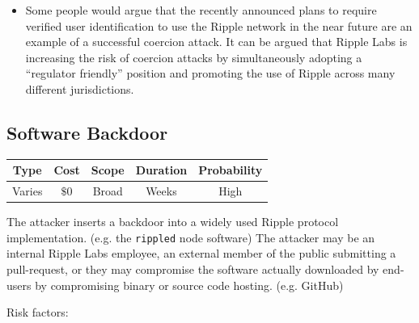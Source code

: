 \documentclass{article}
\begin{document}
\begin{itemize}
    \item Some people would argue that the recently announced
        plans\cite{cointelegraph-ripple-aml} to require verified user
        identification to use the Ripple network in the near future are an
        example of a successful coercion attack. It can be argued that Ripple
        Labs is increasing the risk of coercion attacks by simultaneously
        adopting a ``regulator friendly'' position and promoting the use of
        Ripple across many different jurisdictions.

\end{itemize}

\subsection{Software Backdoor}

\begin{center}
    \begin{tabular}{c|c|c|c|c}
        Type & Cost & Scope & Duration & Probability \\ \hline
        Varies & $\$0$ & Broad & Weeks & High \\
    \end{tabular}
\end{center}

The attacker inserts a backdoor into a widely used Ripple protocol
implementation. (e.g. the \texttt{rippled} node software) The attacker may be an
internal Ripple Labs employee, an external member of the public submitting a
pull-request, or they may compromise the software actually downloaded by
end-users by compromising binary or source code hosting. (e.g. GitHub)

Risk factors:
\end{document}
